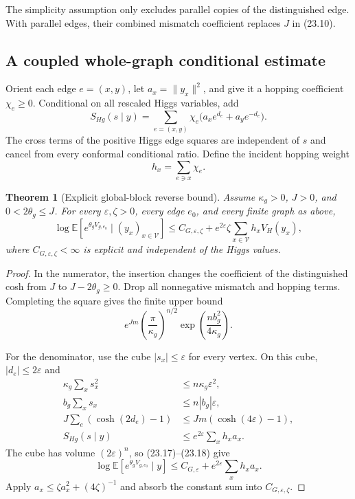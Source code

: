 \documentclass[11pt]{article}
\newtheorem{theorem}{Theorem}[section]
\theoremstyle{remark}
\begin{document}
The simplicity assumption only excludes parallel copies of the
distinguished edge.  With parallel edges, their combined mismatch
coefficient replaces \(J\) in (23.10).

\subsection{A coupled whole-graph conditional estimate}

Orient each edge \(e=(x,y)\), let \(a_x=\|y_x\|^2\), and give it a
hopping coefficient \(\chi_e\geq0\).  Conditional on all rescaled Higgs
variables, add
\[
 S_{H\!g}(s\mid y)
 =\sum_{e=(x,y)}\chi_e
 \bigl(a_xe^{d_e}+a_ye^{-d_e}\bigr).              \tag{23.14}
\]
The cross terms of the positive Higgs edge squares are independent of
\(s\) and cancel from every conformal conditional ratio.  Define the
incident hopping weight
\[
 h_x=\sum_{e\ni x}\chi_e.                          \tag{23.15}
\]

\begin{theorem}[Explicit global-block reverse bound]
\label{thm:v17v23-global-bound}
Assume \(\kappa_g>0\), \(J>0\), and
\(0<2\theta_g\leq J\).  For every \(\varepsilon,\zeta>0\), every edge
\(e_0\), and every finite graph as above,
\[
 \log\mathbb E\left[e^{\theta_gV_{g,e_0}}
 \mid (y_x)_{x\in\mathcal V}\right]
 \leq C_{G,\varepsilon,\zeta}
 +e^{2\varepsilon}\zeta
 \sum_{x\in\mathcal V}h_xV_H(y_x),                \tag{23.16}
\]
where \(C_{G,\varepsilon,\zeta}<\infty\) is explicit and independent
of the Higgs values.
\end{theorem}

\begin{proof}
In the numerator, the insertion changes the coefficient of the
distinguished cosh from \(J\) to \(J-2\theta_g\geq0\).  Drop all
nonnegative mismatch and hopping terms.  Completing the square gives
the finite upper bound
\[
 e^{Jm}
 \left(\frac{\pi}{\kappa_g}\right)^{n/2}
 \exp\left(\frac{nb_g^2}{4\kappa_g}\right).       \tag{23.17}
\]

For the denominator, use the cube \(|s_x|\leq\varepsilon\) for every
vertex.  On this cube, \(|d_e|\leq2\varepsilon\) and
\[
\begin{aligned}
 \kappa_g\sum_xs_x^2&\leq n\kappa_g\varepsilon^2,\\
 b_g\sum_xs_x&\leq n|b_g|\varepsilon,\\
 J\sum_e(\cosh(2d_e)-1)
 &\leq Jm(\cosh(4\varepsilon)-1),\\
 S_{H\!g}(s\mid y)
 &\leq e^{2\varepsilon}\sum_xh_xa_x.              \tag{23.18}
\end{aligned}
\]
The cube has volume \((2\varepsilon)^n\), so (23.17)--(23.18) give
\[
 \log\mathbb E[e^{\theta_gV_{g,e_0}}\mid y]
 \leq C_{G,\varepsilon}
 +e^{2\varepsilon}\sum_xh_xa_x.                  \tag{23.19}
\]
Apply \(a_x\leq\zeta a_x^2+(4\zeta)^{-1}\) and absorb the constant
sum into \(C_{G,\varepsilon,\zeta}\).
\end{proof}
\end{document}
